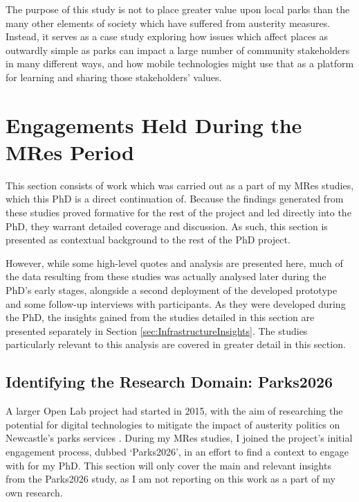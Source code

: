 The purpose of this study is not to place greater value upon local parks than the many other elements of society which have suffered from austerity measures. Instead, it serves as a case study exploring how issues which affect places as outwardly simple as parks can impact a large number of community stakeholders in many different ways, and how mobile technologies might use that as a platform for learning and sharing those stakeholders' values.

\section{Engagements Held During the MRes Period}

This section consists of work which was carried out as a part of my MRes studies, which this PhD is a direct continuation of. Because the findings generated from these studies proved formative for the rest of the project and led directly into the PhD, they warrant detailed coverage and discussion. As such, this section is presented as contextual background to the rest of the PhD project.

However, while some high-level quotes and analysis are presented here, much of the data resulting from these studies was actually analysed later during the PhD's early stages, alongside a second deployment of the developed prototype and some follow-up interviews with participants. As they were developed during the PhD, the insights gained from the studies detailed in this section are presented separately in Section \ref{sec:InfrastructureInsights}. The studies particularly relevant to this analysis are covered in greater detail in this section.

\subsection{Identifying the Research Domain: Parks2026}
\label{sec:Parks2026}

A larger Open Lab project had started in 2015, with the aim of researching the potential for digital technologies to mitigate the impact of austerity politics on Newcastle's parks services \citep{Crivellaro2019}. During my MRes studies, I joined the project's initial engagement process, dubbed `Parks2026', in an effort to find a context to engage with for my PhD. This section will only cover the main and relevant insights from the Parks2026 study, as I am not reporting on this work as a part of my own research.

